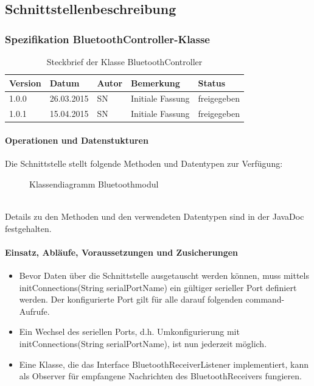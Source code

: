\subsection{Schnittstellenbeschreibung}
\subsubsection{Spezifikation BluetoothController-Klasse}


\begin{table}[h!]
\begin{tabular}{|l|l|l|l|l|}
\hline 
Version & Datum & Autor & Bemerkung & Status \\ 
\hline 
1.0.0 & 26.03.2015 & SN & Initiale Fassung & freigegeben \\ 
\hline 
1.0.1 & 15.04.2015 & SN & Initiale Fassung & freigegeben \\ 
\hline 
\end{tabular} 
\caption{Steckbrief der Klasse BluetoothController}
\end{table}

\paragraph{Operationen und Datenstukturen}
 
Die Schnittstelle stellt folgende Methoden und Datentypen zur Verfügung:  \\
\begin{figure}[h!]          
	\centering             
	\caption{Klassendiagramm Bluetoothmodul}
	\label{fig:Klassendiagramm Bluetoothmodul}        
\end{figure} \\
Details zu den Methoden und den verwendeten Datentypen sind in der JavaDoc festgehalten. \\
\paragraph{Einsatz, Abläufe, Voraussetzungen und Zusicherungen}
\begin{itemize}
	\item{Bevor Daten über die Schnittstelle ausgetauscht werden können, muss mittels initConnections(String serialPortName) ein gültiger serieller Port definiert werden. Der konfigurierte Port gilt für alle darauf folgenden command-Aufrufe. }
	\item{Ein Wechsel des seriellen Ports, d.h. Umkonfigurierung mit initConnections(String serialPortName), ist nun jederzeit möglich.}
	\item{Eine Klasse, die das Interface BluetoothReceiverListener implementiert, kann als Observer für empfangene Nachrichten des BluetoothReceivers fungieren.}
\end{itemize}
